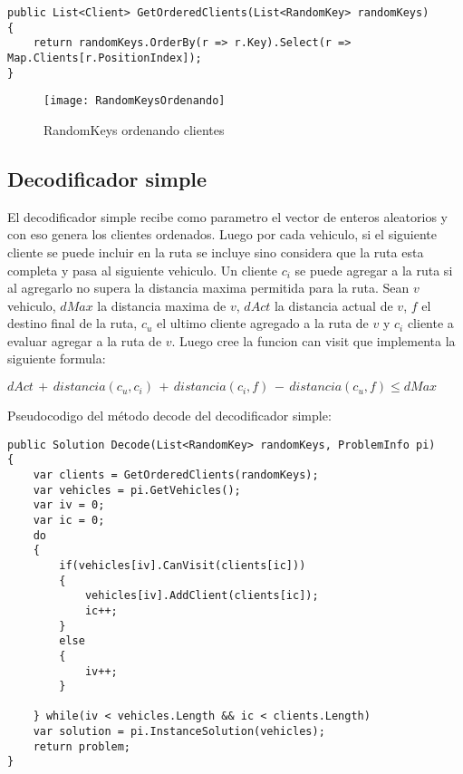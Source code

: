 \bigskip

\begin{lstlisting} 
public List<Client> GetOrderedClients(List<RandomKey> randomKeys)
{        
	return randomKeys.OrderBy(r => r.Key).Select(r => Map.Clients[r.PositionIndex]);
}
\end{lstlisting}

\begin{figure}[h]
	\caption{RandomKeys ordenando clientes}
	\centering
	\texttt{[image: RandomKeysOrdenando]}
	\label{fig:RandomKeysOrdenando}
\end{figure}

\subsection{Decodificador simple}

El decodificador simple recibe como parametro el vector de enteros aleatorios y con eso genera los clientes ordenados. Luego por cada vehiculo, si el siguiente cliente se puede incluir en la ruta se incluye sino considera que la ruta esta completa y pasa al siguiente vehiculo. Un cliente $c_i$ se puede agregar a la ruta si al agregarlo no supera la distancia maxima permitida para la ruta. Sean $v$ vehiculo, $dMax$ la distancia maxima de $v$, $dAct$ la distancia actual de $v$, $f$ el destino final de la ruta, $c_u$ el ultimo cliente agregado a la ruta de $v$ y $c_i$ cliente a evaluar agregar a la ruta de $v$. Luego cree la funcion can visit que implementa la siguiente formula:

\bigskip

\( dAct\, +\, distancia(c_u, c_i)\, +\, distancia(c_i, f)\, -\, distancia(c_u, f) \leq dMax\)

\bigskip

Pseudocodigo del método decode del decodificador simple:

\bigskip

\begin{lstlisting} 
public Solution Decode(List<RandomKey> randomKeys, ProblemInfo pi)
{
	var clients = GetOrderedClients(randomKeys);
	var vehicles = pi.GetVehicles();	
	var iv = 0;
	var ic = 0;	
	do
	{
		if(vehicles[iv].CanVisit(clients[ic]))
		{
			vehicles[iv].AddClient(clients[ic]);
			ic++;
		}
		else
		{
			iv++;			
		}
		
	} while(iv < vehicles.Length && ic < clients.Length)	
	var solution = pi.InstanceSolution(vehicles);
	return problem;
}
\end{lstlisting}

